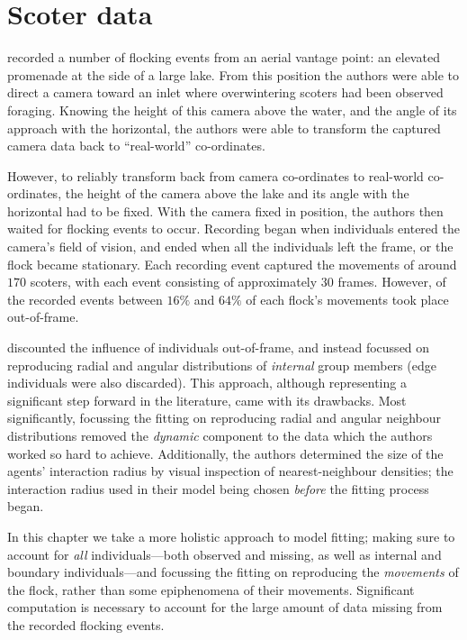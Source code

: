 \section{Scoter data}

\textcite{lukeman10} recorded a number of flocking events from an aerial
vantage point: an elevated promenade at the side of a large lake. From this
position the authors were able to direct a camera toward an inlet where
overwintering scoters had been observed foraging. Knowing the height of this
camera above the water, and the angle of its approach with the horizontal, the
authors were able to transform the captured camera data back to ``real-world''
co-ordinates.

However, to reliably transform back from camera co-ordinates to real-world
co-ordinates, the height of the camera above the lake and its angle with the
horizontal had to be fixed. With the camera fixed in position, the authors then
waited for flocking events to occur. Recording began when individuals entered
the camera's field of vision, and ended when all the individuals left the
frame, or the flock became stationary. Each recording event captured the
movements of around $170$ scoters, with each event consisting of approximately
$30$ frames. However, of the recorded events between $16\%$ and $64\%$ of each
flock's movements took place out-of-frame.

\textcite{lukeman10} discounted the influence of individuals out-of-frame, and
instead focussed on reproducing radial and angular distributions of
\emph{internal} group members (edge individuals were also discarded). This
approach, although representing a significant step forward in the literature,
came with its drawbacks. Most significantly, focussing the fitting on
reproducing radial and angular neighbour distributions removed the
\emph{dynamic} component to the data which the authors worked so hard to
achieve. Additionally, the authors determined the size of the agents'
interaction radius by visual inspection of nearest-neighbour densities; the
interaction radius used in their model being chosen \emph{before} the fitting
process began.

In this chapter we take a more holistic approach to model fitting; making sure
to account for \emph{all} individuals---both observed and missing, as well as
internal and boundary individuals---and focussing the fitting on reproducing
the \emph{movements} of the flock, rather than some epiphenomena of their
movements. Significant computation is necessary to account for the large amount
of data missing from the recorded flocking events.

